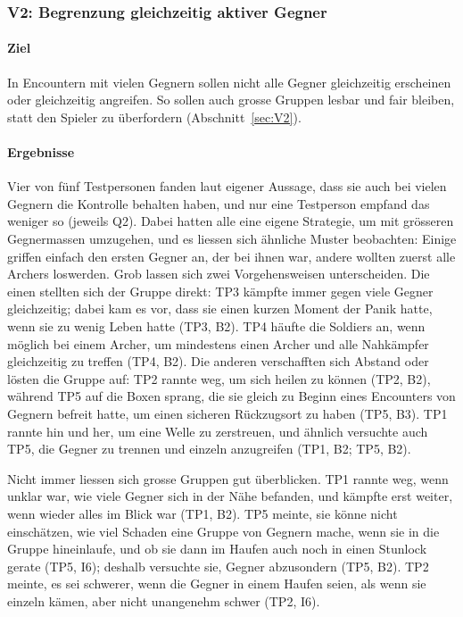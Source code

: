 \documentclass[../Main.tex]{subfiles}
\begin{document}
\subsubsection{V2: Begrenzung gleichzeitig aktiver Gegner}

\paragraph{Ziel}
In Encountern mit vielen Gegnern sollen nicht alle Gegner gleichzeitig erscheinen oder gleichzeitig angreifen. So sollen auch grosse Gruppen lesbar und fair bleiben, statt den Spieler zu überfordern (Abschnitt~\ref{sec:V2}).

\paragraph{Ergebnisse}
Vier von fünf Testpersonen fanden laut eigener Aussage, dass sie auch bei vielen Gegnern die Kontrolle behalten haben, und nur eine Testperson empfand das weniger so (jeweils Q2). Dabei hatten alle eine eigene Strategie, um mit grösseren Gegnermassen umzugehen, und es liessen sich ähnliche Muster beobachten: Einige griffen einfach den ersten Gegner an, der bei ihnen war, andere wollten zuerst alle Archers loswerden. Grob lassen sich zwei Vorgehensweisen unterscheiden. Die einen stellten sich der Gruppe direkt: TP3 kämpfte immer gegen viele Gegner gleichzeitig; dabei kam es vor, dass sie einen kurzen Moment der Panik hatte, wenn sie zu wenig Leben hatte (TP3, B2). TP4 häufte die Soldiers an, wenn möglich bei einem Archer, um mindestens einen Archer und alle Nahkämpfer gleichzeitig zu treffen (TP4, B2). Die anderen verschafften sich Abstand oder lösten die Gruppe auf: TP2 rannte weg, um sich heilen zu können (TP2, B2), während TP5 auf die Boxen sprang, die sie gleich zu Beginn eines Encounters von Gegnern befreit hatte, um einen sicheren Rückzugsort zu haben (TP5, B3). TP1 rannte hin und her, um eine Welle zu zerstreuen, und ähnlich versuchte auch TP5, die Gegner zu trennen und einzeln anzugreifen (TP1, B2; TP5, B2).

Nicht immer liessen sich grosse Gruppen gut überblicken. TP1 rannte weg, wenn unklar war, wie viele Gegner sich in der Nähe befanden, und kämpfte erst weiter, wenn wieder alles im Blick war (TP1, B2). TP5 meinte, sie könne nicht einschätzen, wie viel Schaden eine Gruppe von Gegnern mache, wenn sie in die Gruppe hineinlaufe, und ob sie dann im Haufen auch noch in einen Stunlock gerate (TP5, I6); deshalb versuchte sie, Gegner abzusondern (TP5, B2). TP2 meinte, es sei schwerer, wenn die Gegner in einem Haufen seien, als wenn sie einzeln kämen, aber nicht unangenehm schwer (TP2, I6).
\end{document}
